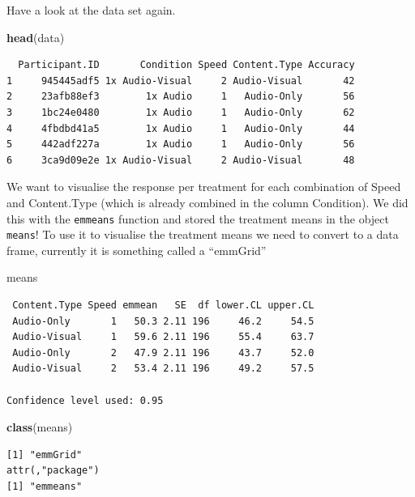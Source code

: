 \documentclass[
  letterpaper,
]{book}
\newenvironment{Shaded}{\begin{snugshade}}{\end{snugshade}}
\newcommand{\FunctionTok}[1]{\textcolor[rgb]{0.13,0.29,0.53}{\textbf{#1}}}
\newcommand{\NormalTok}[1]{#1}
\begin{document}
Have a look at the data set again.

\begin{Shaded}
\begin{Highlighting}[]
\FunctionTok{head}\NormalTok{(data)}
\end{Highlighting}
\end{Shaded}

\begin{verbatim}
  Participant.ID       Condition Speed Content.Type Accuracy
1     945445adf5 1x Audio-Visual     2 Audio-Visual       42
2     23afb88ef3        1x Audio     1   Audio-Only       56
3     1bc24e0480        1x Audio     1   Audio-Only       62
4     4fbdbd41a5        1x Audio     1   Audio-Only       44
5     442adf227a        1x Audio     1   Audio-Only       56
6     3ca9d09e2e 1x Audio-Visual     2 Audio-Visual       48
\end{verbatim}

We want to visualise the response per treatment for each combination of
Speed and Content.Type (which is already combined in the column
Condition). We did this with the \texttt{emmeans} function and stored
the treatment means in the object \texttt{means}! To use it to visualise
the treatment means we need to convert to a data frame, currently it is
something called a ``emmGrid''

\begin{Shaded}
\begin{Highlighting}[]
\NormalTok{means }
\end{Highlighting}
\end{Shaded}

\begin{verbatim}
 Content.Type Speed emmean   SE  df lower.CL upper.CL
 Audio-Only       1   50.3 2.11 196     46.2     54.5
 Audio-Visual     1   59.6 2.11 196     55.4     63.7
 Audio-Only       2   47.9 2.11 196     43.7     52.0
 Audio-Visual     2   53.4 2.11 196     49.2     57.5

Confidence level used: 0.95 
\end{verbatim}

\begin{Shaded}
\begin{Highlighting}[]
\FunctionTok{class}\NormalTok{(means)}
\end{Highlighting}
\end{Shaded}

\begin{verbatim}
[1] "emmGrid"
attr(,"package")
[1] "emmeans"
\end{verbatim}
\end{document}
